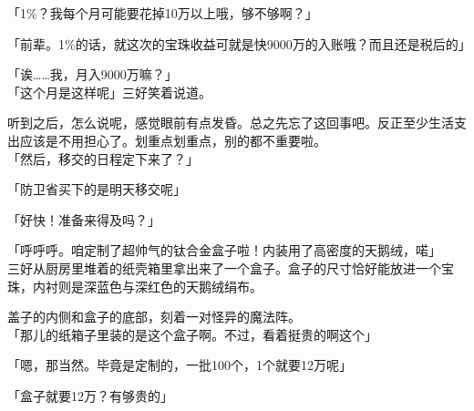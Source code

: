 「1\%？我每个月可能要花掉10万以上哦，够不够啊？」

「前辈。1\%的话，就这次的宝珠收益可就是快9000万的入账哦？而且还是税后的」

「诶……我，月入9000万嘛？」\\

「这个月是这样呢」三好笑着说道。

听到之后，怎么说呢，感觉眼前有点发昏。总之先忘了这回事吧。反正至少生活支出应该是不用担心了。划重点划重点，别的都不重要啦。\\

「然后，移交的日程定下来了？」

「防卫省买下的是明天移交呢」

「好快！准备来得及吗？」

「呼呼呼。咱定制了超帅气的钛合金盒子啦！内装用了高密度的天鹅绒，喏」\\

三好从厨房里堆着的纸壳箱里拿出来了一个盒子。盒子的尺寸恰好能放进一个宝珠，内衬则是深蓝色与深红色的天鹅绒绢布。

盖子的内侧和盒子的底部，刻着一对怪异的魔法阵。\\

「那儿的纸箱子里装的是这个盒子啊。不过，看着挺贵的啊这个」

「嗯，那当然。毕竟是定制的，一批100个，1个就要12万呢」

「盒子就要12万？有够贵的」

